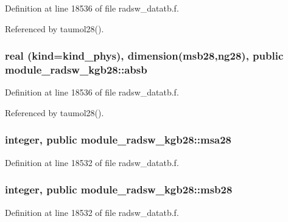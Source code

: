 Definition at line 18536 of file radsw\+\_\+datatb.\+f.



Referenced by taumol28().

\subsubsection[{\texorpdfstring{absb}{absb}}]{\setlength{\rightskip}{0pt plus 5cm}real (kind=kind\+\_\+phys), dimension({\bf msb28},ng28), public module\+\_\+radsw\+\_\+kgb28\+::absb}\hypertarget{namespacemodule__radsw__kgb28_ac3834ddd9d9e2106dc739094c800d09b}{}\label{namespacemodule__radsw__kgb28_ac3834ddd9d9e2106dc739094c800d09b}


Definition at line 18536 of file radsw\+\_\+datatb.\+f.



Referenced by taumol28().

\subsubsection[{\texorpdfstring{msa28}{msa28}}]{\setlength{\rightskip}{0pt plus 5cm}integer, public module\+\_\+radsw\+\_\+kgb28\+::msa28}\hypertarget{namespacemodule__radsw__kgb28_a32c6693eb82a3ed47ed13e07f526471a}{}\label{namespacemodule__radsw__kgb28_a32c6693eb82a3ed47ed13e07f526471a}


Definition at line 18532 of file radsw\+\_\+datatb.\+f.

\subsubsection[{\texorpdfstring{msb28}{msb28}}]{\setlength{\rightskip}{0pt plus 5cm}integer, public module\+\_\+radsw\+\_\+kgb28\+::msb28}\hypertarget{namespacemodule__radsw__kgb28_a55d73e39264b431135c6a9c809e20a94}{}\label{namespacemodule__radsw__kgb28_a55d73e39264b431135c6a9c809e20a94}


Definition at line 18532 of file radsw\+\_\+datatb.\+f.

